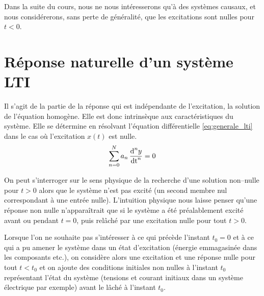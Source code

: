 \begin{remark}{}
	Dans la suite du cours, nous ne nous intéresserons qu'à des
        systèmes causaux, et nous considérerons, sans perte de
        généralité, que les excitations sont nulles pour $t < 0$.
	
	\section{Réponse naturelle d'un système LTI}
	Il s'agit de la partie de la réponse qui est indépendante de
        l'excitation, \cad{} la solution de l'équation homogène. Elle
        est donc intrinsèque aux caractéristiques du système. Elle se
        détermine en résolvant l'équation différentielle
        \ref{eq:generale_lti} dans le cas où l'excitation $x(t)$ est
        nulle.
	\begin{equation}\label{eq:reponse_naturelle}
          \sum_{n=0}^N a_{n}\, \frac{\mathrm{d{}}^{n}y}{{\mathrm{d{t}}}^{n}} = 0
	\end{equation}

        \begin{remarque}
          On peut s'interroger sur le sens physique de la recherche
          d'une solution non--nulle pour $t>0$ alors que le système
          n'est pas excité (un second membre nul correspondant à une
          entrée nulle). L'intuition physique nous laisse penser
          qu'une réponse non nulle n'apparaîtrait que si le système a
          été préalablement excité avant ou pendant $t = 0$, puis \og
          relâché \fg{} par une excitation nulle pour tout $t>0$.

          Lorsque l'on ne souhaite pas s'intéresser à ce qui précède
          l'instant $t_0=0$ et à ce qui a pu amener le système dans un
          état d'excitation (énergie emmagasinée dans les composants
          etc.), on considère alors une excitation et une réponse
          nulle pour tout $t<t_0$ et on ajoute des conditions
          initiales non nulles à l'instant $t_0$ représentant l'état
          du système (tensions et courant initiaux dans un système
          électrique par exemple) avant le lâché à l'instant $t_0$.
      \end{remarque}


\end{remark}

